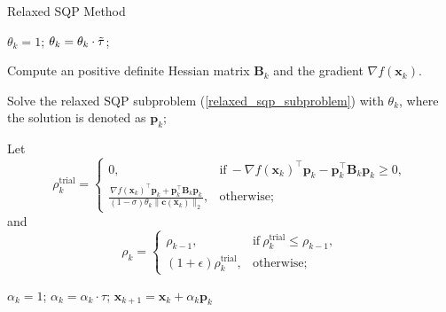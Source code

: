 \documentclass[aos]{imsart}
\numberwithin{equation}{section}
\theoremstyle{plain}
\begin{document}
\begin{algorithm}[h]
 \caption{Relaxed SQP Method}
 \label{alg_det_relaxed_sqp}
 \begin{algorithmic}[1]
 \renewcommand{\algorithmicrequire}{\textbf{Input:} $\bm{\ell} \leq \bm{x}_0 \leq \bm{u}$, $\tau, \Tilde{\tau} \in (0,1)$, $\sigma \in (0,1)$, $\rho_{-1} >0$, $\epsilon>0$, $\beta \in (0,1)$.}
 \REQUIRE 
  \STATE $\theta_k = 1$;
  \STATE $\theta_k = \theta_k \cdot \Tilde{\tau}$;

  \ENDWHILE

  \STATE Compute an positive definite Hessian matrix $\bm{B}_k$ and the gradient $\nabla f(\bm{x}_k)$.
  
  \STATE Solve the relaxed SQP subproblem (\ref{relaxed_sqp_subproblem}) with $\theta_k$, where the solution is denoted as $\bm{p}_k$;

  \STATE Let \begin{equation}
  \label{det_rho_trial}
        \rho_k^{\text{trial}} = \left \{ \begin{array}{cc}
           0,  & \text{if}~ -\nabla f(\bm{x}_k)^{\top} \bm{p}_k - \bm{p}_k^{\top} \bm{B}_k \bm{p}_k \geq 0, \\
           \frac{\nabla f(\bm{x}_k)^{\top} \bm{p}_k + \bm{p}_k^{\top} \bm{B}_k \bm{p}_k}{(1-\sigma)\theta_k \|\bm{c}(\bm{x}_k)\|_2},  &  \text{otherwise;}
        \end{array}\right.
\end{equation}
and
\begin{equation}
\label{det_rho}
    \rho_k = \left\{ \begin{array}{cc}
        \rho_{k-1}, &  \text{if}~\rho_{k}^{\text{trial}} \leq \rho_{k-1}, \\
        (1+\epsilon)\rho_{k}^{\text{trial}}, & \text{otherwise};
    \end{array} \right.
\end{equation}

  \STATE $\alpha_k = 1$;
  \STATE $\alpha_k = \alpha_k \cdot \tau$;
  \ENDWHILE
  \STATE $\bm{x}_{k+1} = \bm{x}_{k} + \alpha_k \bm{p}_{k}$
  \ENDFOR
 \end{algorithmic}
 \end{algorithm}
 
\end{document}

